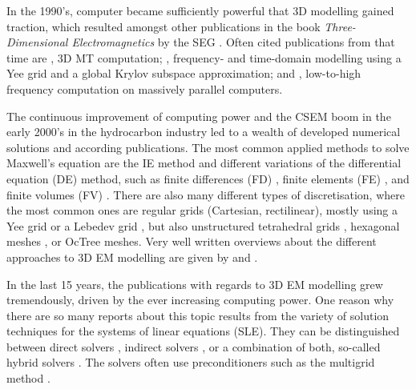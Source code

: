 \documentclass[
    paper,
  ]{geophysics}
\begin{document}
In the 1990's, computer became sufficiently powerful that 3D modelling gained
traction, which resulted amongst other publications in the book
\emph{Three-Dimensional Electromagnetics} by the SEG
\citep{B.SEG.99.Oristaglio}. Often cited publications from that time are
\cite{RSC.94.Mackie}, 3D MT computation; \cite{RS.94.Druskin}, frequency- and
time-domain modelling using a Yee grid and a global Krylov subspace
approximation; and \cite{RS.96.Alumbaugh, GJI.97.Newman}, low-to-high frequency
computation on massively parallel computers.

The continuous improvement of computing power and the CSEM boom in the early
2000's in the hydrocarbon industry led to a wealth of developed numerical
solutions and according publications. The most common applied methods to solve
Maxwell's equation are the IE method \citep{GJI.74.Raiche, RS.02.Hursan,
GEO.06.Zhdanov, GP.10.Tehrani, CAG.16.Kruglyakov, MGS.17.Kruglyakov} and
different variations of the differential equation (DE) method, such as finite
differences (FD) \citep{IEEE.66.Yee, GEO.93.Wang, RSC.94.Mackie, RS.94.Druskin,
GEO.09.Streich, CAG.13.Sommer}, finite elements (FE) \citep{GJI.11.Schwarzbach,
GEO.04.Commer, GEO.12.daSilva, GJI.13.Puzyrev, GJI.13.Grayver, SEG.16.Zhang},
and finite volumes (FV) \citep{EM.90.Madsen, ECP.07.Haber, GEO.14.Jahandari,
PIER.01.Clemens, GP.06.Mulder}. There are also many different types of
discretisation, where the most common ones are regular grids (Cartesian,
rectilinear), mostly using a Yee grid \citep{IEEE.66.Yee} or a Lebedev grid
\citep{CMMP.64.Lebedev}, but also unstructured tetrahedral grids
\citep{SEG.16.Zhang, CAG.17.Cai}, hexagonal meshes \citep{CAG.14.Cai}, or
OcTree meshes\citep{ECP.07.Haber}. Very well written overviews about the
different approaches to 3D EM modelling are given by \cite{SG.05.Avdeev} and
\cite{SG.10.Borner}.

In the last 15 years, the publications with regards to 3D EM modelling grew
tremendously, driven by the ever increasing computing power. One reason why
there are so many reports about this topic results from the variety of solution
techniques for the systems of linear equations (SLE). They can be distinguished
between direct solvers \citep{GEO.09.Streich, GEO.15.Grayver, GP.14.Chung,
GEO.14.Jaysaval, SEG.15.Oh, GJI.18.Wang}, indirect solvers \citep{GP.06.Mulder,
GJI.15.Jaysaval}, or a combination of both, so-called hybrid solvers
\citep{GEO.18.Liu}. The solvers often use preconditioners such as the multigrid
method \citep{SIAM.02.Aruliah, GP.06.Mulder, GJI.16.Jaysaval}.
\end{document}
